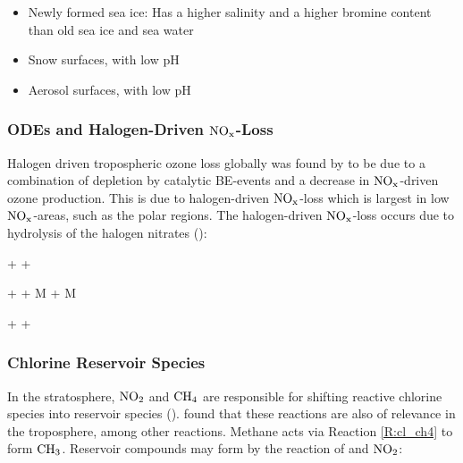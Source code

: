 \begin{itemize}
    \item Newly formed sea ice: Has a higher salinity and a higher bromine content than old sea ice and sea water \cite{Rankin}
    \item Snow surfaces, with low pH
    \item Aerosol surfaces, with low pH
\end{itemize}

\subsubsection{ODEs and Halogen-Driven $\mathrm{NO_x}$-Loss}

Halogen driven tropospheric ozone loss globally was found by \cite{Schmidt} to be due to a combination of depletion by catalytic BE-events and a decrease in $\mathrm{NO_x}$-driven ozone production. This is due to halogen-driven $\mathrm{NO_x}$-loss which is largest in low $\mathrm{NO_x}$-areas, such as the polar regions. The halogen-driven $\mathrm{NO_x}$-loss occurs due to hydrolysis of the halogen nitrates (\cite{Schmidt}):

\begin{reaction}
     +  \rightarrow {} + 
    \label{R:14}
\end{reaction}


\begin{reaction}
     +  + M \rightarrow {} + M
    \label{R:9}
\end{reaction}


\begin{reaction}
     +    + 
    \label{R:13}
\end{reaction}




\subsubsection{Chlorine Reservoir Species}

In the stratosphere, $\mathrm{NO_2}$ and $\mathrm{CH_4}$ are responsible for shifting reactive chlorine species into reservoir species (\cite{SeinfeldSpyros}). \cite{Wang_2019} found that these reactions are also of relevance in the troposphere, among other reactions. Methane acts via Reaction \ref{R:cl_ch4} to form $\mathrm{CH_3}$. Reservoir compounds may form by the reaction of  and $\mathrm{NO_2}$: 

